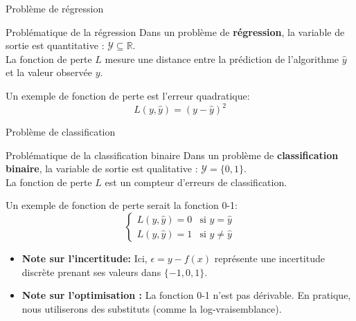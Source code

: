 \documentclass[10pt]{beamer}  %
\begin{document}
\begin{frame}{Problème de régression}
	\begin{block}{Problématique de la régression}
		Dans un problème de \textbf{régression}, la variable de sortie est quantitative : $\mathcal{Y} \subseteq \mathbb{R}$. \\
		\vspace{0.3cm}
		La fonction de perte $L$ mesure une distance entre la prédiction de l'algorithme $\hat{y}$ et la valeur observée $y$. 
	\end{block}
	\pause
	Un exemple de fonction de perte est l'erreur quadratique:
	\begin{equation}
		L(y, \hat{y}) = \left( y - \hat{y}\right)^2
		\nonumber
	\end{equation}
\end{frame}

\begin{frame}{Problème de classification}
	\begin{block}{Problématique de la classification binaire}
		Dans un problème de \textbf{classification binaire}, la variable de sortie est qualitative : $\mathcal{Y} = \{0, 1\}$. \\
		\vspace{0.3cm}
		La fonction de perte $L$ est un compteur d'erreurs de classification. \\
		\vspace{0.3cm}
	\end{block}
	\pause
	Un exemple de fonction de perte serait la fonction 0-1:
	\begin{equation}
		\begin{cases}
			L(y, \hat{y}) = 0 & \text{si } y = \hat{y} \\
			L(y, \hat{y}) = 1 & \text{si } y \ne \hat{y}
		\end{cases}
		\nonumber
	\end{equation}
	\pause
	\begin{itemize}
		\item \textbf{Note sur l'incertitude:} Ici, $\epsilon = y - f(x)$ représente une incertitude discrète prenant ses valeurs dans $\{-1, 0, 1\}$.
		\item \textbf{Note sur l'optimisation :} La fonction 0-1 n'est pas dérivable. En pratique, nous utiliserons des substituts (comme la log-vraisemblance).
	\end{itemize}

\end{frame}

\end{document}
